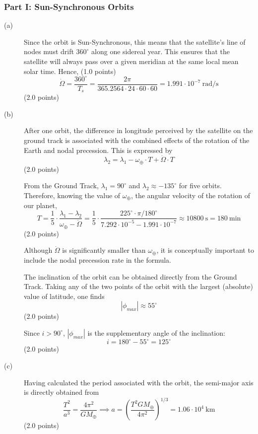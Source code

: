 \subsubsection*{Part I: Sun-Synchronous Orbits}

\begin{description}
\item[(a)] Since the orbit is Sun-Synchronous, this means that the satellite's
  line of nodes must drift $360^\circ$ along one sidereal year. This ensures
  that the satellite will always pass over a given meridian at the same local
  mean solar time. Hence, \hfill(1.0 points)
  \[
    \dot\Omega = \frac{360^\circ}{T_s}
      = \frac{2\pi}{365.2564\cdot24\cdot60\cdot60}
      = 1.991\cdot10^{-7}\ \mathrm{rad/s}
  \]
  \hfill(2.0 points)

\item[(b)] After one orbit, the difference in longitude perceived by the
  satellite on the ground track is associated with the combined effects of the
  rotation of the Earth and nodal precession. This is expressed by
  \[
    \lambda_2 = \lambda_1 - \omega_\oplus\cdot T + \dot\Omega\cdot T
  \]
  \hfill(2.0 points)

  From the Ground Track, $\lambda_1 = 90^\circ$ and
  $\lambda_2 \approx -135^\circ$ for five orbits. Therefore, knowing the value
  of $\omega_\oplus$, the angular velocity of the rotation of our planet,
  \[
    T = \frac{1}{5}\cdot\frac{\lambda_1 - \lambda_2}{\omega_\oplus - \dot\Omega}
      = \frac{1}{5}\cdot
        \frac{225^\circ\cdot\pi/180^\circ}
             {7.292\cdot10^{-5} - 1.991\cdot10^{-7}}
      \approx 10800\ \mathrm{s} = 180\ \mathrm{min}
  \]
  \hfill(2.0 points)

  Although $\dot\Omega$ is significantly smaller than $\omega_\oplus$, it is
  conceptually important to include the nodal precession rate in the formula.

  The inclination of the orbit can be obtained directly from the Ground
  Track. Taking any of the two points of the orbit with the largest (absolute)
  value of latitude, one finds
  \[
    |\phi_{max}| \approx 55^\circ
  \]
  \hfill(2.0 points)

  Since $i > 90^\circ$, $|\phi_{max}|$ is the supplementary angle of the
  inclination:
  \[
    i = 180^\circ - 55^\circ = 125^\circ
  \]
  \hfill(2.0 points)

\item[(c)] Having calculated the period associated with the orbit, the
  semi-major axis is directly obtained from
  \[
    \frac{T^2}{a^3} = \frac{4\pi^2}{GM_\oplus}
    \implies
    a = \left(\frac{T^2 GM_\oplus}{4\pi^2}\right)^{1/3}
      = 1.06\cdot10^4\ \mathrm{km}
  \]
  \hfill(2.0 points)


\end{description}
